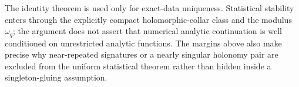 \begin{remark}
\label{rem:v24-exact-versus-stable}
The identity theorem is used only for exact-data uniqueness.  Statistical
stability enters through the explicitly compact holomorphic-collar class and
the modulus \(\omega_q\); the argument does not assert that numerical analytic
continuation is well conditioned on unrestricted analytic functions.  The
margins above also make precise why near-repeated signatures or a nearly
singular holonomy pair are excluded from the uniform statistical theorem
rather than hidden inside a singleton-gluing assumption.
\end{remark}
